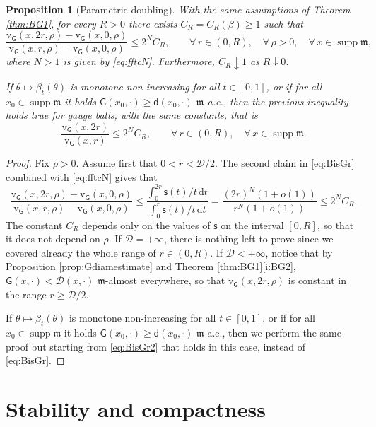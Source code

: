 \documentclass[11pt,a4paper]{article}
\theoremstyle{plain}
\newtheorem{proposition}[theorem]{Proposition}
\theoremstyle{definition}
\theoremstyle{remark}
\numberwithin{equation}{section}
\DeclareMathOperator{\supp}{\mathrm{supp}}
\newcommand{\cD}{\mathcal{D}}
\newcommand{\sfs}{\mathsf{s}}
\newcommand{\rv}{\mathrm{v}}
\newcommand{\di}{\mathrm{d}}
\newcommand{\mm}{\mathfrak m}
\newcommand{\sfd}{\mathsf d}
\newcommand{\sfG}{\mathsf G}
\begin{document}
\begin{proposition}[Parametric doubling]\label{prop:pardoubling}
With the same assumptions of Theorem \ref{thm:BG1}, for every $R>0$ there exists $C_R=C_R(\beta)\geq 1$ such that
\begin{equation}
\frac{\rv_{\sfG}(x, 2r,\rho)- \rv_{\sfG}(x, 0,\rho)}{\rv_{\sfG}(x, r,\rho)- \rv_{\sfG}(x, 0,\rho)}\leq  2^N C_R, \qquad \forall\, r\in (0,R),\quad\forall\, \rho>0, \quad \forall\, x\in \supp\mm,
\end{equation}
where $N>1$ is given by  \eqref{eq:fftcN}. Furthermore, $C_R \downarrow 1$ as $R\downarrow 0$.

If $\theta\mapsto \beta_t(\theta)$ is monotone non-increasing for all $t\in [0,1]$, or if for all $x_0\in\supp\mm$ it holds $\sfG(x_0,\cdot) \geq \sfd(x_0,\cdot)$ $\mm$-a.e., then the previous inequality holds true for gauge balls, with the same constants, that is
\begin{equation}
\frac{\rv_{\sfG}(x, 2r)}{\rv_{\sfG}(x, r)}\leq  2^N C_R, \qquad \forall\, r\in (0,R), \quad \forall\, x\in \supp\mm.
\end{equation}
\end{proposition}
\begin{proof}
Fix $\rho>0$. Assume first that $0<r<\mathcal{D}/2$. The second claim in \eqref{eq:BisGr} combined with \eqref{eq:fftcN} gives that
\[
\frac{\rv_{\sfG}(x, 2r,\rho) - \rv_{\sfG}(x, 0,\rho)}{\rv_{\sfG}(x, r,\rho)  - \rv_{\sfG}(x, 0,\rho) }\leq \frac{ \int_{0}^{2r} \sfs(t)/t \, \di t}{ \int_{0}^{r} \sfs(t)/t \, \di t }= \frac{ (2r)^{N}(1+ o(1))}{ r^{N}(1 + o(1))} \leq 2^N C_R.
\]
The constant $C_R$ depends only on the values of  $\sfs$ on the interval $[0,R]$, so that it does not depend on $\rho$.
If $\mathcal{D} =+\infty$, there is nothing left to prove since we covered already the whole range of $r\in (0,R)$. If $\mathcal{D} < +\infty$, notice that by Proposition \ref{prop:Gdiamestimate} and Theorem \ref{thm:BG1}\ref{i:BG2}, $\sfG(x,\cdot)< \cD(x,\cdot)$ $\mm$-almost everywhere, so that $\rv_{\sfG}(x, 2r,\rho)$ is constant in the range $r \geq \cD/2$.


If $\theta\mapsto \beta_t(\theta)$ is monotone non-increasing for all $t\in [0,1]$, or if for all $x_0\in\supp\mm$ it holds $\sfG(x_0,\cdot) \geq \sfd(x_0,\cdot)$ $\mm$-a.e., then we perform the same proof but starting from \eqref{eq:BisGr2} that holds in this case, instead of \eqref{eq:BisGr}.
\end{proof}
\section{Stability and compactness}\label{sec:stabilityandcompactness}
\end{document}
